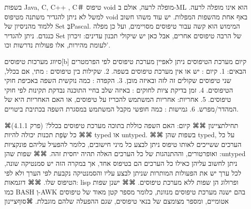       בשפות Java, C, C++ , C＃ טיפוס void מופלה לרעה, אולם ב-ML הוא אינו מופלה לרעה. למשל לא ניתן להגדיר משתנה מטיפוס void באף אחת מהשפות המפלות.
      יש עוד משהו חשוב ללמוד מהניסיון של Set בְּPascal. המימוש הוא קשה עבור טיפוסים מסויימים, ועל כן מפלה כנגדם. ניתן להגדיר Set של הרבה טיפוסים אחרים, אבל כאן יש שיקולי תכנון עדינים: זיכרון לעומת מהירות, אלו פעולות נדרשות וכו'.

      סיווג מערכות טיפוסים[b]
      קיום מערכת הטיפוסים
      ניתן לאפיין מערכת טיפוסים לפי הפרמטרים הבאים:
      1. קיום : יש או אין מערכת טיפוסים בשפה.
      2. שקילות בין טיפוסים : מתי, אם בכלל, שני טיפוסים שקולים זה לזה ובאיזה מובן.
      3. הקפדה : כמה נוקשית השפה באכיפת חוקי הטיפוסים.
      4. זמן בדיקת ציות לחוקים : באיזה שלב בחיי התוכנה נבדקת תקינות לפי חוקי טיפוסים.
      5. אחריות: אחריות המשתמש להכריז על טיפוסים, או האם האחריות היא של המהדר/מפרש.
      6. גמישות : כמה חופשי מקבל המשתמש במסגרת השפה בכתיבת ביטויים.

      ⌘תחילת{ציינון}
      ⌘⌘ קיום: האם השפה כוללת בתוכה מערכת טיפוסים בכלל? (פרק 4.1.1)
      ⌘⌘ כל שְׂפַת תכנות יכולה להיות typed או untyped.
      ⌘⌘ בשפות שהן typed, על כל הערכים ששייכים לאותו טיפוס ניתן לבצע כל מיני חישובים, כלומר להפעיל עליהם פונקציות ואופרטורים, וההתנהגות של כל הערכים האלה תהיה יחסית זהה.
      ⌘⌘ שפות שהן :untyped ניתן לחשוב עליהן כאילו כל הערכים הם בטיפוס אחד, אך במקרה הזה יש סמנטיקה שונה, לכל ערך יש את הפעולות המותרות שניתן לבצע עליו והסמנטיקה נקבעת לפי הערך ולא לפי הטיפוס שלו.
      ⌘⌘ דוגמאות: lisp ופרולוג הן שפות ללא מערכת טיפוסים.
      ⌘⌘ ישנן שפות כמו BASH וְ-AWK בהם ישנה מערכת טיפוסים מנוונת, כלומר מספר קטן מאוד של טיפוסים אטומיים, ומספר מצומצם של בנאי טיפוסים, שגם ההפעלה שלהם מוגבלת.
    ⌘סוף{ציינון}

